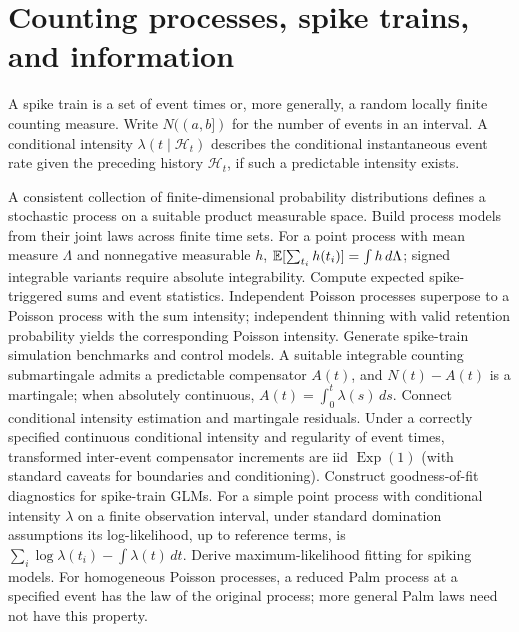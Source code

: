 \chapter{Counting processes, spike trains, and information}
A spike train is a set of event times or, more generally, a random
locally finite counting measure. Write $N((a,b])$ for the number of
events in an interval. A conditional intensity $\lambda(t\mid
\mathcal H_t)$ describes the conditional instantaneous event rate
given the preceding history $\mathcal H_t$, if such a predictable
intensity exists.

{A consistent collection of finite-dimensional probability distributions
defines a stochastic process on a suitable product measurable space.}
{Build process models from their joint laws across finite time sets.}
{For a point process with mean measure $\Lambda$ and nonnegative
measurable $h$, $\mathbb{E}[\sum_{t_i} h(t_i)]=\int h\,d\Lambda$;
signed integrable variants require absolute integrability.}
{Compute expected spike-triggered sums and event statistics.}
{Independent Poisson processes superpose to a Poisson process with
the sum intensity; independent thinning with valid retention
probability yields the corresponding Poisson intensity.}
{Generate spike-train simulation benchmarks and control models.}
{A suitable integrable counting submartingale admits a
predictable compensator $A(t)$, and $N(t)-A(t)$ is a martingale;
when absolutely continuous, $A(t)=\int_0^t\lambda(s)\,ds$.}
{Connect conditional intensity estimation and martingale residuals.}
{Under a correctly specified continuous conditional intensity and
regularity of event times, transformed inter-event compensator
increments are iid $\operatorname{Exp}(1)$ (with standard caveats
for boundaries and conditioning).}
{Construct goodness-of-fit diagnostics for spike-train GLMs.}
{For a simple point process with conditional intensity $\lambda$
on a finite observation interval, under standard domination
assumptions its log-likelihood, up to reference terms, is
$\sum_i\log\lambda(t_i)-\int\lambda(t)\,dt$.}
{Derive maximum-likelihood fitting for spiking models.}
{For homogeneous Poisson processes, a reduced Palm process at a
specified event has the law of the original process; more
general Palm laws need not have this property.}
